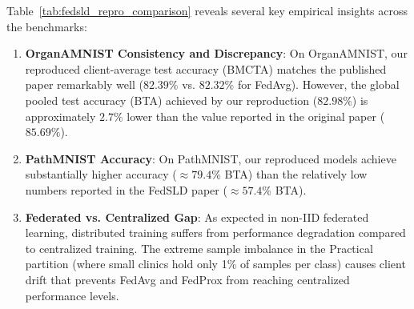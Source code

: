 Table~\ref{tab:fedsld_repro_comparison} reveals several key empirical insights across the benchmarks:
\begin{enumerate}
    \item \textbf{OrganAMNIST Consistency and Discrepancy}: On OrganAMNIST, our reproduced client-average test accuracy (BMCTA) matches the published paper remarkably well ($82.39\%$ vs. $82.32\%$ for FedAvg). However, the global pooled test accuracy (BTA) achieved by our reproduction ($82.98\%$) is approximately $2.7\%$ lower than the value reported in the original paper ($85.69\%$).
    \item \textbf{PathMNIST Accuracy}: On PathMNIST, our reproduced models achieve substantially higher accuracy ($\approx 79.4\%$ BTA) than the relatively low numbers reported in the FedSLD paper ($\approx 57.4\%$ BTA).
    \item \textbf{Federated vs. Centralized Gap}: As expected in non-IID federated learning, distributed training suffers from performance degradation compared to centralized training. The extreme sample imbalance in the Practical partition (where small clinics hold only 1\% of samples per class) causes client drift that prevents FedAvg and FedProx from reaching centralized performance levels.
\end{enumerate}

